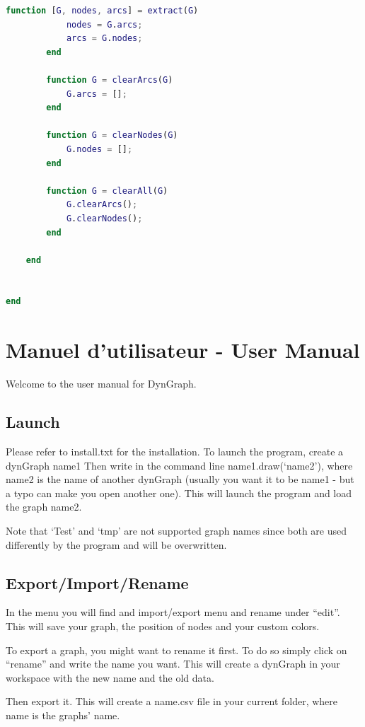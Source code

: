 \documentclass[pidr]{tnreport}
\begin{document}
\begin{lstlisting}[language=matlab, caption={dynGraph.m}, label={lst:dynGraph_m}]
        function [G, nodes, arcs] = extract(G)
            nodes = G.arcs;
            arcs = G.nodes;
        end
        
        function G = clearArcs(G)
            G.arcs = [];
        end
        
        function G = clearNodes(G)
            G.nodes = [];
        end
        
        function G = clearAll(G)
            G.clearArcs();
            G.clearNodes();
        end
        
    end
    
    
end
\end{lstlisting}

\clearpage

\chapter{Manuel d'utilisateur - User Manual}

Welcome to the user manual for DynGraph.

\section{Launch}

Please refer to install.txt for the installation.
To launch the program, create a dynGraph name1
Then write in the command line name1.draw(‘name2’), where name2 is the name of another dynGraph (usually you want it to be name1 - but a typo can make you open another one).
This will launch the program and load the graph name2.

Note that ‘Test’ and ‘tmp’ are not supported graph names since both are used differently by the program and will be overwritten.


\section{Export/Import/Rename}

In the menu you will find and import/export menu and rename under “edit”. This will save your graph, the position of nodes and your custom colors.

To export a graph, you might want to rename it first. To do so simply click on “rename” and write the name you want. This will create a dynGraph in your workspace with the new name and the old data.

Then export it. This will create a name.csv file in your current folder, where name is the graphs’ name.
\end{document}
